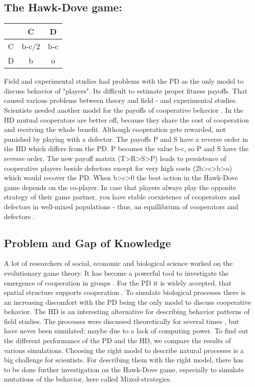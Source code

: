 \subsection{The Hawk-Dove game:}

\begin{tabular}{|c|c|c|}
	\hline  & C & D \\ 
	\hline C & b-c/2 & b-c \\ 
	\hline D & b & o \\ 
	\hline 
\end{tabular} 
 
Field and experimental studies had problems with the PD as the only model to discuss behavior of "players". Its difficult to estimate proper fitness payoffs. That caused various problems between theory and field - and experimental studies. Scientists needed another model for the payoffs of cooperative behavior \citep{milinski1997, nowak1992}. In the HD mutual cooperators are better off, because they share the cost of cooperation and receiving the whole benefit. Although cooperation gets rewarded, not punished by playing with a defector. The payoffs P and S have a reverse order in the HD which differs from the PD. P becomes the value b-c, so P and S have the reverse order. The new payoff matrix (T>R>S>P) leads to persistence of cooperative players beside defectors except for very high costs (2b>c>b>o) which would recover the PD. When b>c>0 the best action in the Hawk-Dove game depends on the co-player. In case that players always play the opposite strategy of their game partner, you have stable coexistence of cooperators and defectors in well-mixed populations - thus, an equillibrium of cooperators and defectors \citep{HauertandDoebeli2004}.

\subsection{Problem and Gap of Knowledge}
A lot of researchers of social, economic and biological science worked on the evolutionary game theory. It has become a powerful tool to investigate the emergence of cooperation in groups \citep{HauertandDoebeli2004}. For the PD it is widely accepted, that spatial structure supports cooperation \citep{margules2000}. To simulate biological processes there is an increasing discomfort with the PD being the only model to discuss cooperative behavior. The HD is an interesting alternative for describing behavior patterns of field studies\citep{milinski1987}. The processes were discussed theoretically for several times \citep{nowak1992, milinski1987}, but have never been simulated; maybe due to a lack of computing power. To find out the different performance of the PD and  the  HD, we compare the results of various simulations. Choosing the right model to describe natural processes is a big challenge for scientists. For describing them with the right model, there has to be done further investigation on the Hawk-Dove game, especially to simulate mutations of the behavior, here called Mixed-strategies. 

